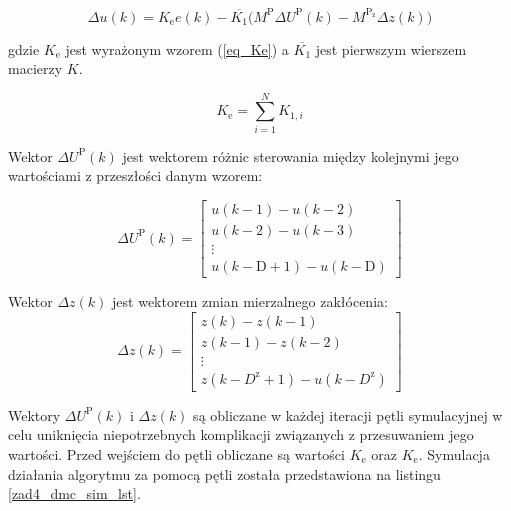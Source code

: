 \begin{equation}
\label{du(k)}
\Delta u(k) = K_{\mathrm{e}} e(k) - \overline{K_{1}} \Big( M^{\mathrm{P}} \Delta U^{\mathrm{P}}(k) - M^{\mathrm{P_{\mathrm{z}}}} \Delta z(k) \Big)
\end{equation}

gdzie $K_{\mathrm{e}}$ jest wyrażonym wzorem (\ref{eq_Ke}) a $\overline{K_{1}}$ jest 
pierwszym wierszem macierzy $K$. 

\begin{equation}
    \label{eq_Ke}
    K_{\mathrm{e}} = \sum_{i=1}^{N} K_{1,i}
\end{equation}
    
Wektor $\Delta U^{\mathrm{P}}(k)$ jest wektorem różnic sterowania między kolejnymi jego wartościami z przeszłości danym wzorem:

\begin{equation}
\Delta U^{\mathrm{P}}(k)=\left[
\begin{array}{c}
u(k-1) - u(k-2)\\
u(k-2) - u(k-3)\\
\vdots\\
u(k-\mathrm{D}+1) - u(k-\mathrm{D})
\end{array}
\right]
\end{equation}

Wektor $\Delta z(k)$ jest wektorem zmian mierzalnego zakłócenia:
\begin{equation}
    \Delta z(k)=\left[
    \begin{array}{c}
    z(k) - z(k-1)\\
    z(k-1) - z(k-2)\\
    \vdots\\
    z(k-D^{\mathrm{z}}+1) - u(k-D^{\mathrm{z}})
    \end{array}
    \right]
\end{equation}



Wektory $\Delta U^{\mathrm{P}}(k)$ i $\Delta z(k)$ są obliczane w każdej iteracji pętli symulacyjnej w celu uniknięcia niepotrzebnych komplikacji związanych z przesuwaniem jego wartości. 
Przed wejściem do pętli obliczane są wartości $K_{\mathrm{e}}$ oraz $K_{\mathrm{e}}$. Symulacja działania algorytmu za pomocą pętli została przedstawiona na listingu \ref{zad4_dmc_sim_lst}.\\

